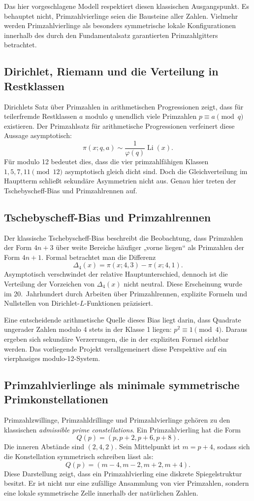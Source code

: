 \documentclass[11pt,a4paper,bibliography=totoc]{scrartcl}
\begin{document}
	Das hier vorgeschlagene Modell respektiert diesen klassischen Ausgangspunkt. Es behauptet nicht, Primzahlvierlinge seien die Bausteine aller Zahlen. Vielmehr werden Primzahlvierlinge als besonders symmetrische lokale Konfigurationen innerhalb des durch den Fundamentalsatz garantierten Primzahlgitters betrachtet.
	
	\subsection{Dirichlet, Riemann und die Verteilung in Restklassen}
	Dirichlets Satz über Primzahlen in arithmetischen Progressionen zeigt, dass für teilerfremde Restklassen $a$ modulo $q$ unendlich viele Primzahlen $p \equiv a \pmod q$ existieren. Der Primzahlsatz für arithmetische Progressionen verfeinert diese Aussage asymptotisch:
	\[
	\pi(x; q, a) \sim \frac{1}{\varphi(q)} \operatorname{Li}(x).
	\]
	Für modulo 12 bedeutet dies, dass die vier primzahlfähigen Klassen $1, 5, 7, 11 \pmod{12}$ asymptotisch gleich dicht sind. Doch die Gleichverteilung im Hauptterm schließt sekundäre Asymmetrien nicht aus. Genau hier treten der Tschebyscheff-Bias und Primzahlrennen auf.
	
	\subsection{Tschebyscheff-Bias und Primzahlrennen}
	Der klassische Tschebyscheff-Bias beschreibt die Beobachtung, dass Primzahlen der Form $4n+3$ über weite Bereiche häufiger „vorne liegen“ als Primzahlen der Form $4n+1$. Formal betrachtet man die Differenz
	\[
	\Delta_4(x) = \pi(x; 4, 3) - \pi(x; 4, 1).
	\]
	Asymptotisch verschwindet der relative Hauptunterschied, dennoch ist die Verteilung der Vorzeichen von $\Delta_4(x)$ nicht neutral. Diese Erscheinung wurde im 20.\ Jahrhundert durch Arbeiten über Primzahlrennen, explizite Formeln und Nullstellen von Dirichlet-$L$-Funktionen präzisiert.
	
	Eine entscheidende arithmetische Quelle dieses Bias liegt darin, dass Quadrate ungerader Zahlen modulo 4 stets in der Klasse 1 liegen: $p^2 \equiv 1 \pmod 4$. Daraus ergeben sich sekundäre Verzerrungen, die in der expliziten Formel sichtbar werden. Das vorliegende Projekt verallgemeinert diese Perspektive auf ein vierphasiges modulo-12-System.
	
	\subsection{Primzahlvierlinge als minimale symmetrische Primkonstellationen}
	Primzahlzwillinge, Primzahldrillinge und Primzahlvierlinge gehören zu den klassischen \emph{admissible prime constellations}. Ein Primzahlvierling hat die Form
	\[
	Q(p) = (p, p+2, p+6, p+8).
	\]
	Die inneren Abstände sind $(2, 4, 2)$. Sein Mittelpunkt ist $m = p+4$, sodass sich die Konstellation symmetrisch schreiben lässt als:
	\[
	Q(p) = (m-4, m-2, m+2, m+4).
	\]
	Diese Darstellung zeigt, dass ein Primzahlvierling eine diskrete Spiegelstruktur besitzt. Er ist nicht nur eine zufällige Ansammlung von vier Primzahlen, sondern eine lokale symmetrische Zelle innerhalb der natürlichen Zahlen.
	
\end{document}
